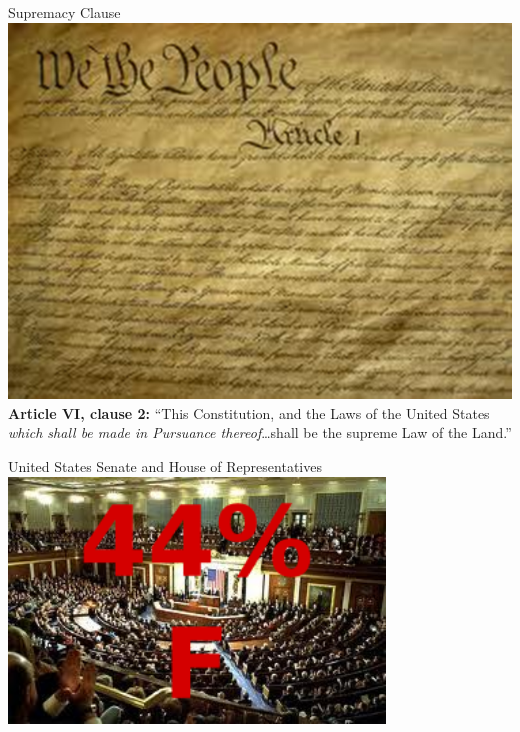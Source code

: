 \begin{frame}{Supremacy Clause}
   \centering
   \includegraphics[height=.7\textheight]{img/constitution.png} \\
   \textbf{Article VI, clause 2:} ``This Constitution, and the Laws of the
   United States \emph{which shall be made in Pursuance thereof}\ldots shall be
   the supreme Law of the Land.''
\end{frame}

\begin{frame}{United States Senate and House of Representatives}
    \centering
    \includegraphics[width=0.75\textwidth]{img/house-senate-fail.png} \\
\end{frame}

